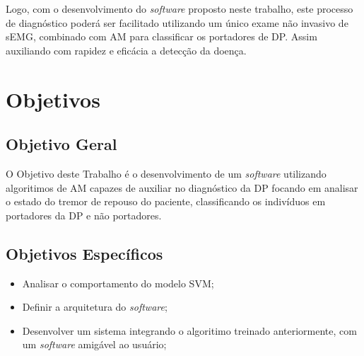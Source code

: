Logo, com o desenvolvimento do \textit{software} proposto neste trabalho, este processo de diagnóstico poderá ser facilitado utilizando um único exame não invasivo de sEMG, combinado com AM para classificar os portadores de DP. Assim auxiliando com rapidez e eficácia a detecção da doença. 

\section{Objetivos} 
\subsection{Objetivo Geral} 
O Objetivo deste Trabalho é o desenvolvimento de um \textit{software} utilizando algoritimos de AM capazes de auxiliar no diagnóstico da DP focando em analisar o estado do tremor de repouso do paciente, classificando os indivíduos em portadores da DP e não portadores. 

\subsection{Objetivos Específicos}
\begin{itemize}
    \item Analisar o comportamento do modelo SVM;
    \item Definir a arquitetura do \textit{software};
    \item Desenvolver um sistema integrando o algoritimo treinado anteriormente, com um \textit{software} amigável ao usuário;
\end{itemize}